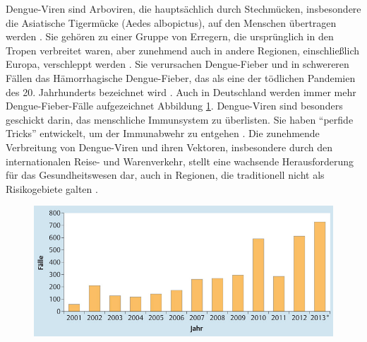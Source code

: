 \documentclass[german,version-2022-01]{uzl-thesis}
\begin{document}
Dengue-Viren sind Arboviren, die haupts\"achlich durch Stechm\"ucken, insbesondere die Asiatische Tigerm\"ucke (Aedes albopictus), auf den Menschen \"ubertragen werden \cite{cramer_dengue-virus_2014}. Sie geh\"oren zu einer Gruppe von Erregern, die urspr\"unglich in den Tropen verbreitet waren, aber zunehmend auch in andere Regionen, einschlie\ss{}lich Europa, verschleppt werden \cite{cramer_dengue-virus_2014}. Sie verursachen Dengue-Fieber und in schwereren F\"allen das H\"amorrhagische Dengue-Fieber, das als eine der t\"odlichen Pandemien des 20. Jahrhunderts bezeichnet wird \cite{kuhnle_dengue-fieber_1999}. Auch in Deutschland werden immer mehr Dengue-Fieber-F\"alle aufgezeichnet Abbildung \ref{fig:Dengue_virus_infektionszahlen_deutschland}. Dengue-Viren sind besonders geschickt darin, das menschliche Immunsystem zu \"uberlisten. Sie haben "`perfide Tricks"' entwickelt, um der Immunabwehr zu entgehen \cite{janisch_klein_2017}. Die zunehmende Verbreitung von Dengue-Viren und ihren Vektoren, insbesondere durch den internationalen Reise- und Warenverkehr, stellt eine wachsende Herausforderung f\"ur das Gesundheitswesen dar, auch in Regionen, die traditionell nicht als Risikogebiete galten \cite{cramer_dengue-virus_2014}. 
\begin{figure}[htpb]
  \centering
  \includegraphics[scale=0.5]{Images/infektionszahlen_dengue_virus_deutschland.jpeg}
  \caption{ \cite{cramer_dengue-virus_2014}}
  \label{fig:Dengue_virus_infektionszahlen_deutschland}
\end{figure}
\end{document}
